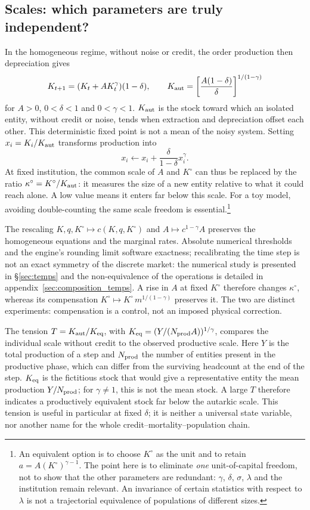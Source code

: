 \subsection{Scales: which parameters are truly independent?}
\label{sec:parametres_reduits}
In the homogeneous regime, without noise or credit, the order
production then depreciation gives
\[
 K_{t+1}=(K_t+A K_t^\gamma)(1-\delta),\qquad
 K_{\rm aut}=\left[\frac{A(1-\delta)}{\delta}\right]^{1/(1-\gamma)}
\]
for $A>0$, $0<\delta<1$ and $0<\gamma<1$. $K_{\rm aut}$ is the stock toward which an isolated entity, without
credit or noise, tends when extraction and depreciation offset each
other. This deterministic fixed point is not a mean of the noisy
system. Setting $x_i=K_i/K_{\rm aut}$ transforms
production into
\[
 x_i\longleftarrow x_i+\frac{\delta}{1-\delta}x_i^\gamma .
\]
At fixed institution, the common scale of $A$ and $K^\circ$ can thus
be replaced by the ratio $\kappa^\circ=K^\circ/K_{\rm aut}$: it
measures the size of a new entity relative to what it could reach
alone. A low value means it enters far below this scale. For a
toy model, avoiding double-counting the same scale freedom is
essential.\footnote{An equivalent option is to choose $K^\circ$ as the
unit and to retain $a=A (K^\circ)^{\gamma-1}$. The point here is to
eliminate \emph{one} unit-of-capital freedom, not to show that the
other parameters are redundant: $\gamma$, $\delta$, $\sigma$,
$\lambda$ and the institution remain relevant. An invariance of
certain statistics with respect to $\lambda$ is not a trajectorial
equivalence of populations of different sizes.}

The rescaling $K,q,K^\circ\mapsto c(K,q,K^\circ)$ and
$A\mapsto c^{1-\gamma}A$ preserves the homogeneous equations and the
marginal rates. Absolute numerical thresholds and the engine's
rounding limit software exactness; recalibrating the time step is not
an exact symmetry of the discrete market: the numerical study is
presented in \S\ref{sec:temps} and the non-equivalence of the
operations is detailed in appendix~\ref{sec:composition_temps}. A rise
in $A$ at fixed $K^\circ$ therefore changes $\kappa^\circ$, whereas its
compensation $K^\circ\mapsto K^\circ\,m^{1/(1-\gamma)}$ preserves it.
The two are distinct experiments: compensation is a control, not an
imposed physical correction.

The tension $T=K_{\rm aut}/K_{\rm eq}$, with
$K_{\rm eq}=(Y/(N_{\rm prod}A))^{1/\gamma}$, compares the individual
scale without credit to the observed productive scale. Here $Y$ is
the total production of a step and $N_{\rm prod}$ the number of
entities present in the productive phase, which can differ from the
surviving headcount at the end of the step. $K_{\rm eq}$ is the
fictitious stock that would give a representative entity the mean
production $Y/N_{\rm prod}$; for $\gamma\ne1$, this is not the mean
stock. A large $T$ therefore indicates a productively equivalent
stock far below the autarkic scale. This tension is useful in
particular at fixed $\delta$; it is neither a universal state
variable, nor another name for the whole
credit--mortality--population chain.

